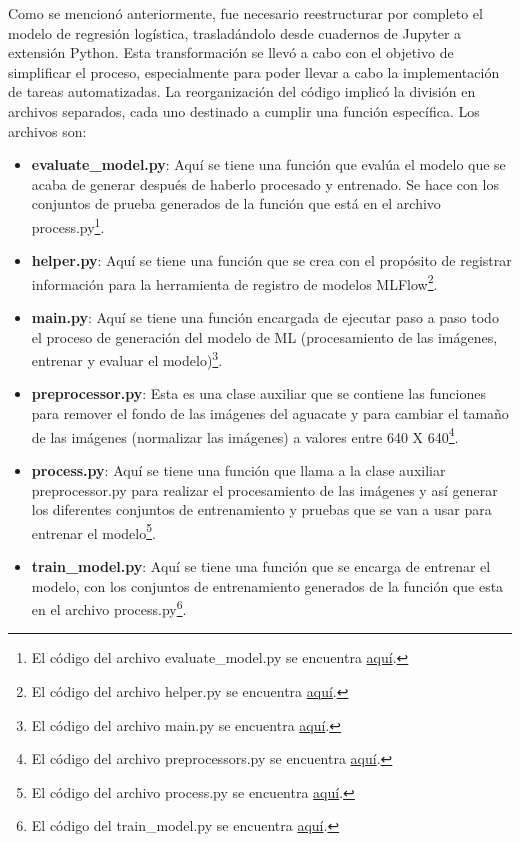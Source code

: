 Como se mencionó anteriormente, fue necesario reestructurar por completo el modelo de regresión logística, trasladándolo desde cuadernos de Jupyter a extensión Python. Esta transformación se llevó a cabo con el objetivo de simplificar el proceso, especialmente para poder llevar a cabo la implementación de tareas automatizadas. La reorganización del código implicó la división en archivos separados, cada uno destinado a cumplir una función específica. Los archivos son: \newline

\newpage

\begin{itemize}
    \item \textbf{evaluate\_model.py}: Aquí se tiene una función que evalúa el modelo que se acaba de generar después de haberlo procesado y entrenado. Se hace con los conjuntos de prueba generados de la función que está en el archivo process.py\footnote{El código del archivo evaluate\_model.py se encuentra \href{https://github.com/juferoto/mlops_project/blob/master/training/src/evaluate_model.py}{aquí}.}.
    \item \textbf{helper.py}: Aquí se tiene una función que se crea con el propósito de registrar información para la herramienta de registro de modelos MLFlow\footnote{El código del archivo helper.py se encuentra \href{https://github.com/juferoto/mlops_project/blob/master/training/src/helper.py}{aquí}.}.
    \item \textbf{main.py}: Aquí se tiene una función encargada de ejecutar paso a paso todo el proceso de generación del modelo de ML (procesamiento de las imágenes, entrenar y evaluar el modelo)\footnote{El código del archivo main.py se encuentra \href{https://github.com/juferoto/mlops_project/blob/master/training/src/main.py}{aquí}.}.
    \item \textbf{preprocessor.py}: Esta es una clase auxiliar que se contiene las funciones para remover el fondo de las imágenes del aguacate y para cambiar el tamaño de las imágenes (normalizar las imágenes) a valores entre 640 X 640\footnote{El código del archivo preprocessors.py se encuentra \href{https://github.com/juferoto/mlops_project/blob/master/training/src/preprocessors.py}{aquí}.}.
    \item \textbf{process.py}: Aquí se tiene una función que llama a la clase auxiliar preprocessor.py para realizar el procesamiento de las imágenes y así generar los diferentes conjuntos de entrenamiento y pruebas que se van a usar para entrenar el modelo\footnote{El código del archivo process.py se encuentra \href{https://github.com/juferoto/mlops_project/blob/master/training/src/process.py}{aquí}.}.
    \item \textbf{train\_model.py}: Aquí se tiene una función que se encarga de entrenar el modelo, con los conjuntos de entrenamiento generados de la función que esta en el archivo process.py\footnote{El código del train\_model.py se encuentra \href{https://github.com/juferoto/mlops_project/blob/master/training/src/train_model.py}{aquí}.}.
\end{itemize}

